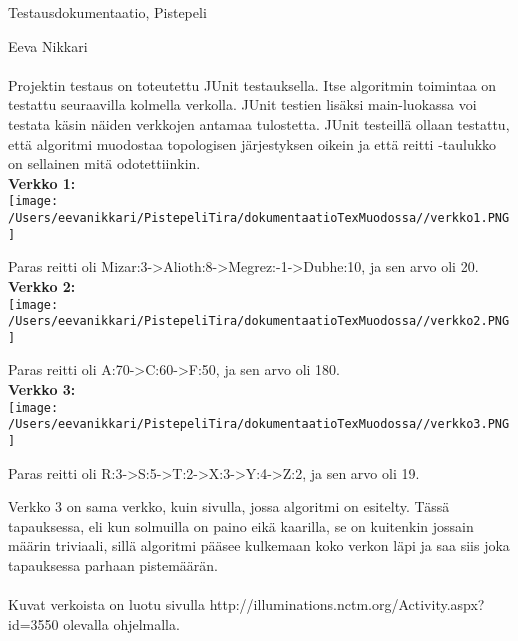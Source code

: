 \documentclass[12pt,a4paper,leqno]{amsart}
\begin{document}
Testausdokumentaatio, Pistepeli

Eeva Nikkari\\\\

Projektin testaus on toteutettu JUnit testauksella. Itse algoritmin toimintaa on testattu seuraavilla kolmella verkolla. JUnit testien lisäksi main-luokassa voi testata käsin näiden verkkojen antamaa tulostetta. JUnit testeillä ollaan testattu, että algoritmi muodostaa topologisen järjestyksen oikein ja että reitti -taulukko on sellainen mitä odotettiinkin.\\

\textbf{Verkko 1:}\\
\texttt{[image: /Users/eevanikkari/PistepeliTira/dokumentaatioTexMuodossa//verkko1.PNG]}

Paras reitti oli Mizar:3->Alioth:8->Megrez:-1->Dubhe:10, ja sen arvo oli 20.\\

\textbf{Verkko 2:}\\
\texttt{[image: /Users/eevanikkari/PistepeliTira/dokumentaatioTexMuodossa//verkko2.PNG]}

Paras reitti oli A:70->C:60->F:50, ja sen arvo oli 180.\\

\textbf{Verkko 3:}\\
\texttt{[image: /Users/eevanikkari/PistepeliTira/dokumentaatioTexMuodossa//verkko3.PNG]}

Paras reitti oli R:3->S:5->T:2->X:3->Y:4->Z:2, ja sen arvo oli 19.



Verkko 3 on sama verkko, kuin sivulla, jossa algoritmi on esitelty. Tässä tapauksessa, eli kun solmuilla on paino eikä kaarilla, se on kuitenkin jossain määrin triviaali, sillä algoritmi pääsee kulkemaan koko verkon läpi ja saa siis joka tapauksessa parhaan pistemäärän.
\\\\
Kuvat verkoista on luotu sivulla http://illuminations.nctm.org/Activity.aspx?id=3550 olevalla ohjelmalla.
\end{document}
